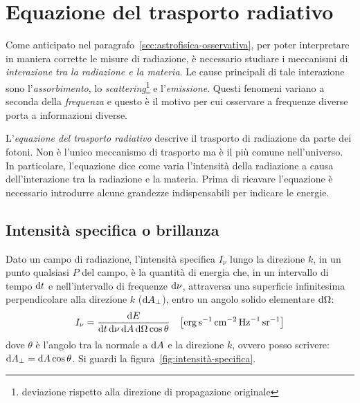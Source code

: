 \section{Equazione del trasporto radiativo}\label{sec:intro-trasporto-radiativo}
Come anticipato nel paragrafo~\ref{sec:astrofisica-osservativa}, per poter interpretare in maniera corrette le misure di radiazione, è necessario studiare i meccanismi di \emph{interazione tra la radiazione e la materia}. Le cause principali di tale interazione sono l'\emph{assorbimento}, lo \emph{scattering}\footnote{deviazione rispetto alla direzione di propagazione originale} e l'\emph{emissione}. Questi fenomeni variano a seconda della \emph{frequenza} e questo è il motivo per cui osservare a frequenze diverse porta a informazioni diverse.

L'\emph{equazione del trasporto radiativo} descrive il trasporto di radiazione da parte dei fotoni. Non è l'unico meccanismo di trasporto ma è il più comune nell'universo. In particolare, l'equazione dice come varia l'intensità della radiazione a causa dell'interazione tra la radiazione e la materia. Prima di ricavare l'equazione è necessario introdurre alcune grandezze indispensabili per indicare le energie.

\subsection{Intensità specifica o brillanza}\label{sec:intensità}
Dato un campo di radiazione, l'intensità specifica $I_\nu$ lungo la direzione $k$, in un punto qualsiasi $P$ del campo, è la quantità di energia che, in un intervallo di tempo $\ud t$ e nell'intervallo di frequenze $\ud \nu$, attraversa una superficie infinitesima perpendicolare alla direzione $k$ ($\ud A_\perp$), entro un angolo solido elementare $\ud \Omega$:
\begin{equation}\label{eq:intensità}
    I_\nu = \frac{\ud E}{\ud t \ud \nu \ud A \ud \Omega \cos{\theta}} \quad \bigl[\si{erg.s^{-1}.cm^{-2}.Hz^{-1}.sr^{-1}}\bigr]
\end{equation}
dove $\theta$ è l'angolo tra la normale a $\ud A$ e la direzione $k$, ovvero posso scrivere: $\ud A_\perp = \ud A \cos{\theta}$. Si guardi la figura~\ref{fig:intensità-specifica}.

